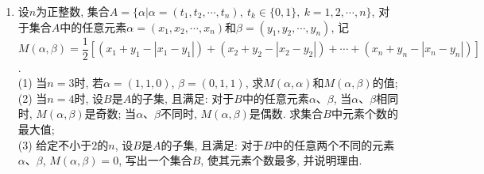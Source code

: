 \documentclass[10pt,a4paper]{article}
\begin{document}
\begin{enumerate}[1.]
\item 设$n$为正整数, 集合$A=\{\alpha|\alpha =(t_1,t_2,\cdots ,t_n),\ t_k\in \{0,1\}, \ k=1,2,\cdots,n\}$, 对于集合$A$中的任意元素$\alpha =(x_1,x_2,\cdots ,x_n)$和$\beta =(y_1,y_2,\cdots ,y_n)$, 记
$M(\alpha ,\beta)=\dfrac 12[(x_1+y_1-|x_1-y_1|)+(x_2+y_2-|x_2-y_2|)+\cdots +(x_n+y_n-|x_n-y_n|)]$.\\
(1) 当$n=3$时, 若$\alpha =(1,1,0)$, $\beta =(0,1,1)$, 求$M(\alpha ,\alpha)$和$M(\alpha ,\beta)$的值;\\
(2) 当$n=4$时, 设$B$是$A$的子集, 且满足: 对于$B$中的任意元素$\alpha$、$\beta$, 当$\alpha$、$\beta$相同时, $M(\alpha ,\beta)$是奇数; 当$\alpha$、$\beta$不同时, $M(\alpha ,\beta)$是偶数. 求集合$B$中元素个数的最大值;\\
(3) 给定不小于$2$的$n$, 设$B$是$A$的子集, 且满足: 对于$B$中的任意两个不同的元素$\alpha$、$\beta$, $M(\alpha ,\beta)=0$, 写出一个集合$B$, 使其元素个数最多, 并说明理由.


\end{enumerate}
\end{document}
